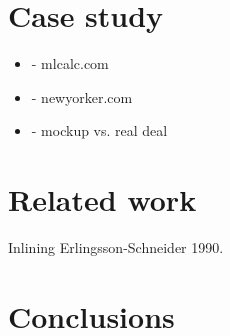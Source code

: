 \documentclass{llncs}
\begin{document}
\section{Case study}
\label{sec:case}

\begin{itemize}
\item- mlcalc.com
\item- newyorker.com
\item- mockup vs. real deal
\end{itemize}

\section{Related work}
\label{sec:related}

Inlining Erlingsson-Schneider 1990.

\section{Conclusions}
\label{sec:conc}



\end{document}
